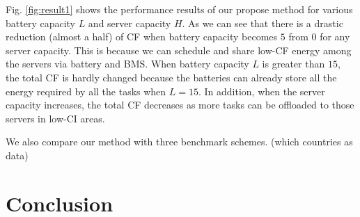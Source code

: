 \documentclass[conference, 10pt, ﬁnal, letterpaper, twocolumn]{IEEEtran}
\begin{document}


Fig. \ref{fig:result1} shows the performance results of our propose method for various battery capacity $L$ and server capacity $H$. As we can see that there is a drastic reduction (almost a half) of CF when battery capacity becomes $5$ from $0$ for any server capacity. This is because we can schedule and share low-CF energy among the servers via battery and BMS. When battery capacity $L$ is greater than $15$, the total CF is hardly changed because the batteries can already store all the energy required by all the tasks when $L = 15$. In addition, when the server capacity increases, the total CF decreases as more tasks can be offloaded to those servers in low-CI areas.





We also compare our method with three benchmark schemes. (which countries as data)





\section{Conclusion} \label{Sec:conclusion}




\end{document}
